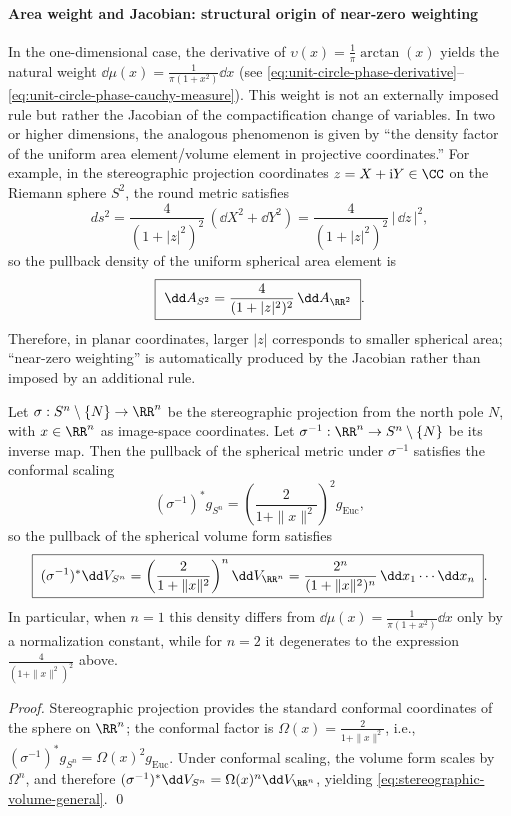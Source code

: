 \paragraph{Area weight and Jacobian: structural origin of near-zero weighting}
In the one-dimensional case, the derivative of \(\upsilon(x)=\frac{1}{\pi}\arctan(x)\) yields the natural weight \(\dd\mu(x)=\frac{1}{\pi(1+x^2)}\dd x\) (see \eqref{eq:unit-circle-phase-derivative}--\eqref{eq:unit-circle-phase-cauchy-measure}).
This weight is not an externally imposed rule but rather the Jacobian of the compactification change of variables.
In two or higher dimensions, the analogous phenomenon is given by ``the density factor of the uniform area element/volume element in projective coordinates.''
For example, in the stereographic projection coordinates \(z=X+\mathrm{i}Y\in\CC\) on the Riemann sphere \(S^{2}\), the round metric satisfies
\[
ds^{2}=\frac{4}{(1+|z|^{2})^{2}}\,(\dd X^{2}+\dd Y^{2})
=\frac{4}{(1+|z|^{2})^{2}}\,|\,\dd z\,|^{2},
\]
so the pullback density of the uniform spherical area element is
\[
\boxed{\ \dd A_{S^{2}}=\frac{4}{(1+|z|^{2})^{2}}\,\dd A_{\RR^{2}}\ }.
\]
Therefore, in planar coordinates, larger \(|z|\) corresponds to smaller spherical area; ``near-zero weighting'' is automatically produced by the Jacobian rather than imposed by an additional rule.

\begin{proposition}\label{prop:stereographic-volume-form}
Let \(\sigma:S^{n}\setminus\{N\}\to\RR^{n}\) be the stereographic projection from the north pole \(N\), with \(x\in\RR^{n}\) as image-space coordinates.
Let \(\sigma^{-1}:\RR^{n}\to S^{n}\setminus\{N\}\) be its inverse map.
Then the pullback of the spherical metric under \(\sigma^{-1}\) satisfies the conformal scaling
\[
(\sigma^{-1})^{\ast}g_{S^{n}}=\left(\frac{2}{1+\|x\|^{2}}\right)^{2}g_{\mathrm{Euc}},
\]
so the pullback of the spherical volume form satisfies
\begin{equation}\label{eq:stereographic-volume-general}
\boxed{\;
(\sigma^{-1})^{\ast}\dd V_{S^{n}}
 =\left(\frac{2}{1+\|x\|^{2}}\right)^{n}\dd V_{\RR^{n}}
=\frac{2^{n}}{(1+\|x\|^{2})^{n}}\,\dd x_{1}\cdots \dd x_{n}\; }.
\end{equation}
In particular, when \(n=1\) this density differs from \(\dd\mu(x)=\frac{1}{\pi(1+x^{2})}\dd x\) only by a normalization constant, while for \(n=2\) it degenerates to the expression \(\frac{4}{(1+\|x\|^{2})^{2}}\) above.
\end{proposition}
\begin{proof}
Stereographic projection provides the standard conformal coordinates of the sphere on \(\RR^{n}\); the conformal factor is \(\Omega(x)=\frac{2}{1+\|x\|^{2}}\), i.e., \((\sigma^{-1})^{\ast}g_{S^{n}}=\Omega(x)^{2}g_{\mathrm{Euc}}\).
Under conformal scaling, the volume form scales by \(\Omega^{n}\), and therefore
\(
(\sigma^{-1})^{\ast}\dd V_{S^{n}}=\Omega(x)^{n}\dd V_{\RR^{n}}
\), yielding \eqref{eq:stereographic-volume-general}. \qed
\end{proof}

